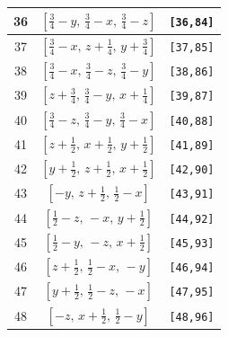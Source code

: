\documentclass[fleqn,8pt]{jsarticle}
\begin{document}
\begin{longtable}{ccc}
36 & $\left[ \frac{3}{4} - y,\, \frac{3}{4} - x,\, \frac{3}{4} - z \right]$ & {\tt [36,84]} \\ \hline
37 & $\left[ \frac{3}{4} - x,\, z + \frac{1}{4},\, y + \frac{3}{4} \right]$ & {\tt [37,85]} \\ \hline
38 & $\left[ \frac{3}{4} - x,\, \frac{3}{4} - z,\, \frac{3}{4} - y \right]$ & {\tt [38,86]} \\ \hline
39 & $\left[ z + \frac{3}{4},\, \frac{3}{4} - y,\, x + \frac{1}{4} \right]$ & {\tt [39,87]} \\ \hline
40 & $\left[ \frac{3}{4} - z,\, \frac{3}{4} - y,\, \frac{3}{4} - x \right]$ & {\tt [40,88]} \\ \hline
41 & $\left[ z + \frac{1}{2},\, x + \frac{1}{2},\, y + \frac{1}{2} \right]$ & {\tt [41,89]} \\ \hline
42 & $\left[ y + \frac{1}{2},\, z + \frac{1}{2},\, x + \frac{1}{2} \right]$ & {\tt [42,90]} \\ \hline
43 & $\left[ - y,\, z + \frac{1}{2},\, \frac{1}{2} - x \right]$ & {\tt [43,91]} \\ \hline
44 & $\left[ \frac{1}{2} - z,\, - x,\, y + \frac{1}{2} \right]$ & {\tt [44,92]} \\ \hline
45 & $\left[ \frac{1}{2} - y,\, - z,\, x + \frac{1}{2} \right]$ & {\tt [45,93]} \\ \hline
46 & $\left[ z + \frac{1}{2},\, \frac{1}{2} - x,\, - y \right]$ & {\tt [46,94]} \\ \hline
47 & $\left[ y + \frac{1}{2},\, \frac{1}{2} - z,\, - x \right]$ & {\tt [47,95]} \\ \hline
48 & $\left[ - z,\, x + \frac{1}{2},\, \frac{1}{2} - y \right]$ & {\tt [48,96]} \\
\end{longtable}
\end{document}
